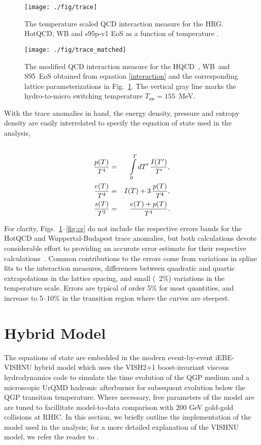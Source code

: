 \documentclass[aps,prc,reprint,amsmath,nofootinbib,superscriptaddress]{revtex4-1}
\newcommand{\hotqcd}{HQCD~}
\newcommand{\wb}{WB~}
\newcommand{\spv}{S95~}
\begin{document}
\begin{figure}[t]
  \texttt{[image: ./fig/trace]}
  \caption{\label{fig:trace} The temperature scaled QCD interaction measure for the HRG. HotQCD, WB and s95p-v1 EoS as a function of temperature \cite{Bazavov:2014pvz, Borsanyi:2013bia, Huovinen:2009yb}.}
\end{figure}

\begin{figure}[b]
  \texttt{[image: ./fig/trace\_matched]}
  \caption{\label{fig:trace_final} The modified QCD interaction measure for the \hotqcd, \wb and \spv EoS obtained from equation \eqref{interaction} and the corresponding lattice
	  parameterizations in Fig.~\ref{fig:trace}. The vertical gray line marks the hydro-to-micro switching temperature $T_\text{sw} = 155$~MeV.}
\end{figure}

With the trace anomalies in hand, the energy density, pressure and entropy density are easily interrelated to specify the equation of state used in the analysis,
\begin{eqnarray}
 \label{conversion}
 \cr \frac{p(T)}{T^4} &=& \int\limits_0^T dT'\, \frac{I(T')}{T'}, \\
 \frac{e(T)}{T^4} &=& I(T) + 3\, \frac{p(T)}{T^4}, \\
 \frac{s(T)}{T^3} &=& \frac{e(T) + p(T)}{T^4}. 
\end{eqnarray}
 
For clarity, Figs.~\ref{fig:trace}--\ref{fig:cs} do not include the respective errors bands for the HotQCD and Wuppertal-Budapest trace anomalies, but both calculations devote considerable effort
to providing an accurate error estimate for their respective calculations~\cite{Borsanyi:2013bia,Bazavov:2014pvz}.  Common contributions to the errors
come from variations in spline fits to the interaction measures, differences between quadratic and quartic extrapolations in the lattice spacing, and
small (~2\%) variations in the temperature scale.  Errors are typical of order 5\% for most quantities, and increase to 5--10\% in the transition region
where the curves are steepest.


\section{Hybrid Model}

The equations of state are embedded in the modern event-by-event iEBE-VISHNU hybrid model which uses the VISH2+1 boost-invariant viscous hydrodynamics code to simulate the 
time evolution of the QGP medium and a microscopic UrQMD hadronic afterburner for subsequent evolution below the QGP transition temperature. Where necessary, free
parameters of the model are are tuned to facillitate model-to-data comparison with $200$ GeV gold-gold collisions at RHIC. In this section, we briefly outline
the implementation of the model used in the analysis; for a more detailed explanation of the VISHNU model, we refer the reader to \cite{Shen:2014vra}. 
\end{document}
